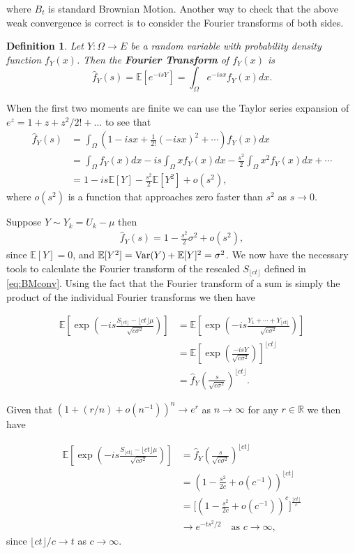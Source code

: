 \documentclass[honours,12pt]{unswthesis}
\newcommand{\R}{\mathbb{R}}
\newcommand{\E}{\mathbb{E}}
\newcommand{\1}{\mathbf 1}
\newcommand{\Var}{\mathop{\rm Var}}
\newtheorem{definition}[equation]{Definition}
\numberwithin{equation}{section}
\theoremstyle{definition}
\theoremstyle{remark}
\begin{document}
\noindent where $B_t$ is standard Brownian Motion. Another way to check that the above weak convergence is correct is to consider the Fourier transforms of both sides.\\
\begin{definition}
	Let $Y:\Omega\to E$ be a random variable with probability density function $f_Y(x)$. Then the \textbf{Fourier Transform}  of $f_Y(x)$ is
	\[
		\hat{f}_Y(s)=\E[e^{-isY}]=\int_\Omega e^{-isx} f_Y(x)dx.
	\]
\end{definition}

\noindent When the first two moments are finite we can use the Taylor series expansion of $e^z=1+z+z^2/2!+...$ to see that
\begin{align}
	\hat{f}_Y(s)&=\int_\Omega\left(1-isx+\frac{1}{2!}(-isx)^2+\cdots \right)f_Y(x)dx\\
	&=\int_\Omega f_Y(x)dx - is \int_\Omega x f_Y(x)dx - \frac{s^2}{2}\int_\Omega x^2 f_Y(x)dx +\cdots\\
	&=1-is\E[Y]-\frac{s^2}{2}\E[Y^2] +o(s^2),
\end{align}
\noindent where $o(s^2)$ is a function that approaches zero faster than $s^2$ as $s\to0.$ 

Suppose $Y\sim Y_k=U_k-\mu$ then 
\begin{align}
\hat{f}_{Y}(s)=1-\frac{s^2}{2}\sigma^2+o(s^2),
\end{align}
\noindent since $\E[Y]=0$, and $\E[Y^2]=\Var(Y)+\E[Y]^2=\sigma^2$. We now have the necessary tools to calculate the Fourier transform of the rescaled $S_{\lfloor ct\rfloor}$ defined in \ref{eq:BMconv}. Using the fact that the Fourier transform of a sum is simply the product of the individual Fourier transforms we then have

\begin{align}
	\E\left[\exp\left( -is\frac{S_{\lfloor ct\rfloor}-\lfloor ct \rfloor \mu}{\sqrt{c\sigma^2}}    \right)\right]
	&= \E\left[\exp\left( -is\frac{Y_1+\cdots+Y_{\lfloor ct\rfloor}}{\sqrt{c\sigma^2}}    \right)\right]\\
	&= \E\left[\exp\left( \frac{-isY}{\sqrt{c\sigma^2}}    \right)\right]^{\lfloor ct\rfloor}\\
	&=\hat{f}_{Y}\left(\frac{s}{\sqrt{c\sigma^2}}\right)^{\lfloor ct\rfloor}.
\end{align}

\noindent Given that $(1+(r/n)+o(n^{-1}))^n\to e^r$ as $n\to\infty$ for any $r\in\R$ we then have

\begin{align}
	\E\left[\exp\left( -is\frac{S_{\lfloor ct\rfloor}-\lfloor ct \rfloor \mu}{\sqrt{c\sigma^2}}    \right)\right]
	&=\hat{f}_{Y}\left(\frac{s}{\sqrt{c\sigma^2}}\right)^{\lfloor ct\rfloor}\nonumber\\
	&=\left(1-\frac{s^2}{2c}+o(c^{-1})\right)^{\lfloor ct\rfloor}\\
	&=\Bigg[\left(1-\frac{s^2}{2c}+o(c^{-1})\right)^c\Bigg]^\frac{\lfloor ct\rfloor}{c}\\	
	&\to e^{-ts^2/2} \quad\textrm{as $c\to\infty,$}
\end{align}
\noindent since $\lfloor ct\rfloor/c\to t$ as $c\to\infty.$
\end{document}
